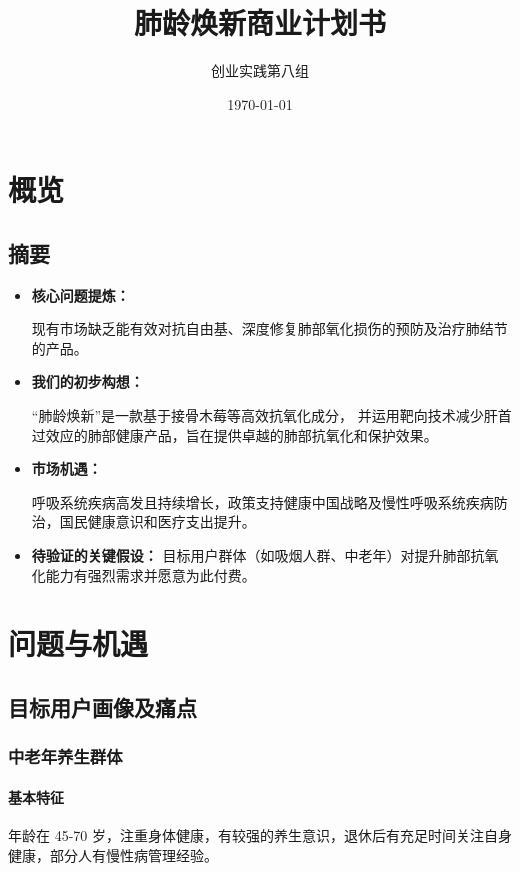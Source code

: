 \documentclass[12pt]{ctexart}
\title{\textbf{肺龄焕新}商业计划书}
\author{创业实践第八组}
\date{\today}
\begin{document}
\maketitle

\tableofcontents
\clearpage

\section{概览}
\subsection{摘要}
\begin{itemize}
    \item \textbf{核心问题提炼：}

    现有市场缺乏能有效对抗自由基、深度修复肺部氧化损伤的预防及治疗肺结节的产品。

    \item \textbf{我们的初步构想：}

    “肺龄焕新”是一款基于接骨木莓等高效抗氧化成分，
    并运用靶向技术减少肝首过效应的肺部健康产品，旨在提供卓越的肺部抗氧化和保护效果。

    \item \textbf{市场机遇：}

    呼吸系统疾病高发且持续增长，政策支持健康中国战略及慢性呼吸系统疾病防治，国民健康意识和医疗支出提升。

    \item \textbf{待验证的关键假设：}
    目标用户群体（如吸烟人群、中老年）对提升肺部抗氧化能力有强烈需求并愿意为此付费。

\end{itemize}
\section{问题与机遇}
\subsection{目标用户画像及痛点}

\subsubsection{中老年养生群体}
\paragraph{基本特征}
年龄在 45-70 岁，注重身体健康，有较强的养生意识，退休后有充足时间关注自身健康，部分人有慢性病管理经验。
\end{document}
